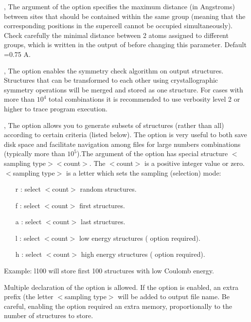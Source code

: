 \documentclass[a4paper,english]{article}
\begin{document}
\begin{Description}
\item[\OptArg{-t }{tolerance}, \OptArg{\Dd tolerance=}{tolerance}]
      The argument of the option specifies the maximum distance (in Angstroms) between sites that should be contained within the same group (meaning that the corresponding positions in the supercell cannot be occupied simultaneously). Check carefully the minimal distance between 2 atoms assigned to different groups, which is written in the output of  before changing this parameter. Default =0.75 A.

\item[\Opt{-m}, \Opt{\Dd merge-symmetric}]
      The option enables the symmetry check algorithm on output structures. Structures that can be transformed to each other using crystallographic symmetry operations will be merged and stored as one structure. For cases with more than $10^4$ total combinations it is recommended to use verbosity level 2 or higher to trace program execution.
      
\item[\OptArg{-n }{selection}, \OptArg{\Dd store-structures=}{selection}]
      The option allows you to generate subsets of structures (rather than all) according to certain criteria (listed below). The option is very useful to both save disk space and facilitate navigation among files for large numbers combinations (typically more than $10^5$).The argument of the option has special structure $<$sampling type$><$count$>$. The $<$count$>$ is a positive integer value or zero. $<$sampling type$>$ is a letter which sets the sampling (selection) mode:
      \begin{itemize}
        \item[r]: select $<$count$>$ random structures.
        \item[f]: select $<$count$>$ first structures.
        \item[a]: select $<$count$>$ last structures.
        \item[l]: select $<$count$>$ low energy structures ( option required).
        \item[h]: select $<$count$>$ high energy structures ( option required).
      \end{itemize}
      Example: l100 will store first 100 structures with low Coulomb energy.
      
      Multiple declaration of the option is allowed. If the option is enabled, an extra prefix (the letter $<$sampling type$>$ will be added to output file name. Be careful, enabling the option required an extra memory, proportionally to the number of structures to store.


\end{Description}
\end{document}
